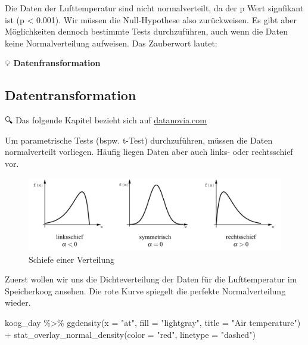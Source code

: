 \documentclass[
]{article}
\newenvironment{Shaded}{\begin{snugshade}}{\end{snugshade}}
\newcommand{\AttributeTok}[1]{\textcolor[rgb]{0.77,0.63,0.00}{#1}}
\newcommand{\FunctionTok}[1]{\textcolor[rgb]{0.00,0.00,0.00}{#1}}
\newcommand{\NormalTok}[1]{#1}
\newcommand{\SpecialCharTok}[1]{\textcolor[rgb]{0.00,0.00,0.00}{#1}}
\newcommand{\StringTok}[1]{\textcolor[rgb]{0.31,0.60,0.02}{#1}}
\begin{document}
Die Daten der Lufttemperatur sind nicht normalverteilt, da der p Wert signfikant ist (p \textless{} 0.001). Wir müssen die Null-Hypothese also zurückweisen. Es gibt aber Möglichkeiten dennoch bestimmte Tests durchzuführen, auch wenn die Daten keine Normalverteilung aufweisen. Das Zauberwort lautet:

💡 \textbf{Datenfransformation}

\hypertarget{datentransformation}{%
\subsection{Datentransformation}\label{datentransformation}}

🔍 Das folgende Kapitel bezieht sich auf \href{https://www.datanovia.com/en/lessons/transform-data-to-normal-distribution-in-r/}{datanovia.com}

Um parametrische Tests (bspw. t-Test) durchzuführen, müssen die Daten normalverteilt vorliegen. Häufig liegen Daten aber auch links- oder rechtsschief vor.

\begin{figure}

{\centering \includegraphics[width=1\linewidth]{images/045} 

}

\caption{Schiefe einer Verteilung}\label{fig:unnamed-chunk-259}
\end{figure}

Zuerst wollen wir uns die Dichteverteilung der Daten für die Lufttemperatur im Speicherkoog ansehen. Die rote Kurve spiegelt die perfekte Normalverteilung wieder.

\begin{Shaded}
\begin{Highlighting}[]
\NormalTok{koog\_day }\SpecialCharTok{\%\textgreater{}\%}
  \FunctionTok{ggdensity}\NormalTok{(}\AttributeTok{x =} \StringTok{"at"}\NormalTok{, }\AttributeTok{fill =} \StringTok{"lightgray"}\NormalTok{, }\AttributeTok{title =} \StringTok{"Air temperature"}\NormalTok{) }\SpecialCharTok{+}
  \FunctionTok{stat\_overlay\_normal\_density}\NormalTok{(}\AttributeTok{color =} \StringTok{"red"}\NormalTok{, }\AttributeTok{linetype =} \StringTok{"dashed"}\NormalTok{)}
\end{Highlighting}
\end{Shaded}
\end{document}

